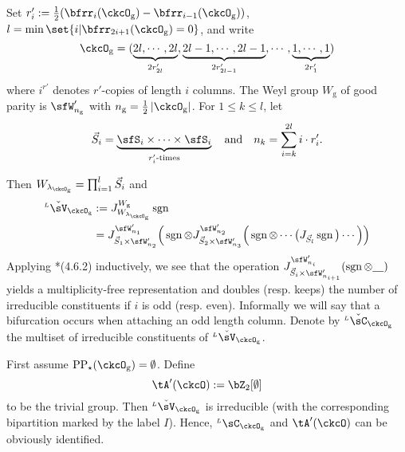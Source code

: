 \documentclass[12pt]{amsart}
\def\abs#1{\left|{#1}\right|}
\newcommand{\sgn}{\operatorname{sgn}}
\numberwithin{equation}{section}
\theoremstyle{remark}
\def\half{{\tfrac{1}{2}}}
\def\lamckg{\lambda_{\ckcO_{\mathrm g}}}
\def\LC{{}^{\scriptscriptstyle L}\sC}
\def\ckLC{{}^{\scriptscriptstyle L}\check{\sC}}
\def\ckLV{{}^{\scriptscriptstyle L}\check\sV}
\def\ckLC{{}^{\scriptscriptstyle L}\check\sC}
\def\Wg{W_{\mathrm g}}
\def\AND{\quad \text{and} \quad}
\def\CPPs{\mathrm{PP}_{\star}}
\begin{document}
{    Set $r'_{i} := \half(\bfrr_{i}(\ckcO_{\mathrm g})-\bfrr_{i-1}(\ckcO_{\mathrm g}))$,
    $l =\min\set{i|\bfrr_{2i+1}(\ckcO_{\mathrm g})=0}$, and write
    \[
      \ckcO_{\mathrm g} %
      = (\underbrace{2l,\cdots, 2l}_{2r'_{2l}}, \underbrace{2l-1,\cdots, 2l-1}_{2r'_{2l-1}},\cdots,
      \underbrace{1,\cdots, 1}_{2r'_{1}})
    \]
    where $i^{r'}$ denotes $r'$-copies of length $i$ columns.
    The Weyl group $W_{\mathrm g}$ of good parity is $\sfW'_{n_{\mathrm g}}$ with
    $n_{\mathrm g} = \half\abs{\ckcO_{\mathrm g}}$. For $1\leq k\leq l$, let
    \[
      \vec{S}_{i} = \underbrace{\sfS_{i}\times \cdots\times \sfS_{i}}_{r'_{i}\text{-times}} \AND n_{k} = \sum_{i=k}^{2l} i\cdot r'_{i}.
    \]

    Then $W_{\lamckg}=\prod_{i=1}^{l} \vec{S}_{i}$ and
    \[
      \begin{split}
        \ckLV_{\ckcO_{\mathrm g}}& :=J_{W_{\lamckg}}^{\Wg}\sgn\\
        & = J_{\vec{S}_{1}\times \sfW'_{n_{2}}}^{\sfW'_{n_{1}}} \Big(\sgn \otimes J_{\vec{S}_{2}\times \sfW'_{n_{3}}}^{\sfW'_{n_{2}}}\Big(\sgn
        \otimes \cdots\big(J_{\vec{S}_{l}} \sgn\big)\cdots \Big)\Big) \\
      \end{split}
    \]
    Applying \cite{Lu}*{(4.6.2)} inductively, we see that the operation
    $J_{\vec{S}_{i}\times \sfW'_{n_{i+1}}}^{\sfW'_{n_{i}}}(\sgn \otimes \underline{\ \ \ })$ yields a multiplicity-free representation and
    doubles (resp. keeps) the number of irreducible constituents if $i$ is odd (resp. even). Informally we will say that a bifurcation occurs when attaching an odd length column.
    Denote by $\ckLC_{\ckcO_{\mathrm g}}$ the multiset of irreducible constituents of $\ckLV_{\ckcO_{\mathrm g}}$.

    First assume $\CPPs(\ckcO_{\mathrm g}) = \emptyset$. Define
    \[
      \tA'(\ckcO):= \bZ_{2}[\emptyset]
    \]
    to be the trivial group.
    Then $\ckLV_{\ckcO_{\mathrm g}}$ is
    irreducible (with the corresponding bipartition marked by the label $I$).  Hence, $\LC_{\ckcO_{\mathrm g}}$
    and $\tA'(\ckcO)$ can be obviously identified.


}
\end{document}
